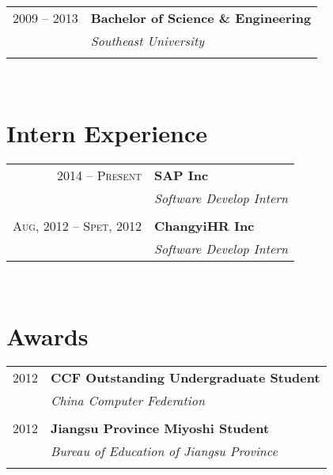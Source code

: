 \documentclass[UTF8,10pt]{article} %
\begin{document}
{\begin{minipage}[t]{0.44\textwidth}
\begin{tabular}{rl}

2009 -- 2013 & \textbf{Bachelor of Science \& Engineering} \\ 
& \textit{Southeast University}\\
&\\
	 


\end{tabular}\\[10pt]



\section{Intern Experience}

\begin{tabular}{rl}
2014 -- \textsc{Present} & \textbf{SAP Inc}\\
& \textit{Software Develop Intern}\\
&\\
\textsc{Aug}, 2012 -- \textsc{Spet, 2012} & \textbf{ChangyiHR Inc}\\
& \textit{Software Develop Intern}\\


\end{tabular}\\[10pt]



\section{Awards} 

\begin{tabular}{rl}
2012	 & \textbf{CCF Outstanding Undergraduate Student}\\
& \textit{China Computer Federation}\\ \\



2012	 & \textbf{Jiangsu Province Miyoshi Student}\\
&  \textit{Bureau of Education of Jiangsu Province}\\ \\


\end{tabular}
\end{minipage}}
\end{document}

